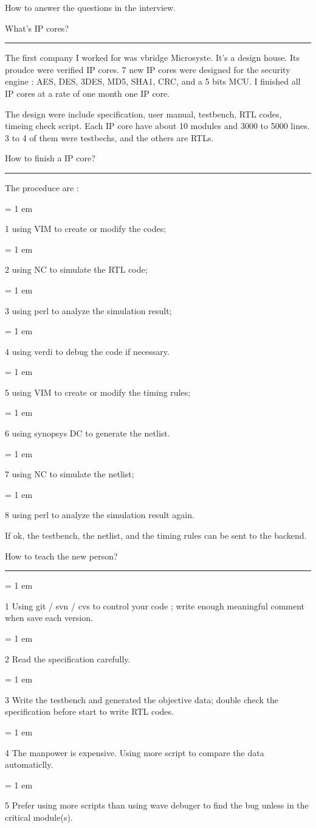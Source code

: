 

\centerline{ \FFbg
How to answer the questions in the interview.
}

{ \medbreak } { \FFbg
What's IP cores?
} { \smallbreak } {\par\noindent\hrule} { \smallbreak }

    The first company I worked for was vbridge Microsyste.
It's a design house. Its proudce were verified IP cores.
7 new IP cores were designed for the security engine : 
AES, DES, 3DES, MD5, SHA1, CRC, and a 5 bits MCU.
I finished all IP cores at a rate of one month one IP core.

The design were include specification, user manual, testbench, 
RTL codes, timeing check script. 
Each IP core have about 10 modules and 3000 to 5000 lines.
3 to 4 of them were testbechs, and the others are RTLs.


{ \medbreak } { \FFbg
How to finish a IP core?
} { \smallbreak } {\par\noindent\hrule} { \smallbreak }

The proceduce are : 

{ \parindent = 1 em \item{1} 
using VIM to create or modify the codes;
}
{ \parindent = 1 em \item{2} 
using NC to simulate the RTL code;
}
{ \parindent = 1 em \item{3} 
using perl to analyze the simulation result;
}
{ \parindent = 1 em \item{4} 
using verdi to debug the code if necessary.
}
{ \parindent = 1 em \item{5} 
using VIM to create or modify the timing rules;
}
{ \parindent = 1 em \item{6} 
using synopsys DC to generate the netlist.
}
{ \parindent = 1 em \item{7} 
using NC to simulate the netlist;
}
{ \parindent = 1 em \item{8} 
using perl to analyze the simulation result again.
}

If ok, the testbench, the netlist, and the timing rules can be sent to the backend.



{ \medbreak } { \FFbg
How to teach the new person?
} { \smallbreak } {\par\noindent\hrule} { \smallbreak }

{ \parindent = 1 em \item{1} 
Using git / svn / cvs to control your code ; write enough meaningful comment when save each version.
}
{ \parindent = 1 em \item{2} 
Read the specification carefully.
}
{ \parindent = 1 em \item{3} 
Write the testbench and generated the objective data; double check the specification before start to write RTL codes.
}
{ \parindent = 1 em \item{4} 
The manpower is expensive. Using more script to compare the data automaticlly. 
}
{ \parindent = 1 em \item{5} 
Prefer using more scripts than using wave debuger to find the bug 
unless in the critical module(s).
}

\bye
